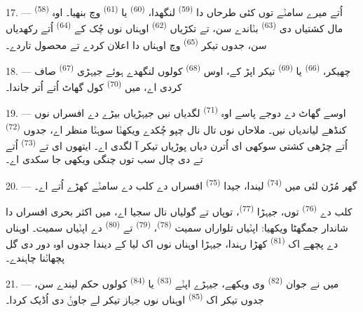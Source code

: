 17. ---  \textsuperscript{(58)} اُتے میرے سامݨے توں کئی طرحاں دا
 \textsuperscript{(59)} لنگھدا،  \textsuperscript{(60)}
یا  \textsuperscript{(61)} وچ بنھیا۔ اوہ مال کشتیاں دی
 \textsuperscript{(63)} بݨاندے سن، تے تکڑیاں 
\textsuperscript{(62)} اوہناں نوں چُک کے  \textsuperscript{(64)} اُتے
رکھدیاں سن، جدوں تیکر   \textsuperscript{(65)} وچ
اوہناں دا اعلان کردے تے محصول تاردے۔

18. --- چھیکر،  \textsuperscript{(66)} یا
 \textsuperscript{(69)} تیکر اپڑ کے، اوس 
\textsuperscript{(68)} کولوں لنگھدے ہوئے جیہڑی  \textsuperscript{(67)}
صاف کردی اے، میں  \textsuperscript{(70)} کول گھاٹ اُتے اُتر
جاندا۔

19. --- اوسے گھاٹ دے دوجے پاسے اوہ  \textsuperscript{(71)}
لگدیاں نیں جیہڑیاں بیڑے دے افسراں نوں کنڈھے لیاندیاں نیں۔ ملاحاں نوں تال نال چپو
چُکدے ویکھݨا سوہݨا منظر اے، جدوں  \textsuperscript{(72)} اُتے چڑھی کشتی
سوکھی ای اُترن دیاں پوڑیاں تیکر آ لگدی اے۔ ایتھوں ای  تے
 \textsuperscript{(73)} اُتے  تے  دی چال سب
توں چنگی ویکھی جا سکدی اے۔

\VUsaut{3.0mm}
\VUsaut{3.0mm}

20. --- گھر مُڑن لئی میں  \textsuperscript{(74)} لیندا، جیدا
 \textsuperscript{(75)} افسراں دے کلب دے سامݨے کھڑے 
اُتے اے۔

کلب دے  \textsuperscript{(76)} توں، جیہڑا 
\textsuperscript{(77)}، توپاں تے گولیاں نال سجیا اے، میں اکثر بحری افسراں دا شاندار
جمگھٹا ویکھیا: اپݨیاں تلواراں سمیت  \textsuperscript{(78)}،
 \textsuperscript{(79)} تے  \textsuperscript{(80)}
دے  اپݨیاں  سمیت۔ اوہناں دے پچھے اک 
\textsuperscript{(81)} کھڑا رہندا، جیہڑا اوہناں نوں اک  لیا کے دیندا
جدوں اوہ دور دی گل پچھاݨنا چاہندے۔

21. --- میں نے جوان  \textsuperscript{(82)} وی ویکھے، جیہڑے
اپݨے  \textsuperscript{(83)} یا  \textsuperscript{(84)}
کولوں حکم لیندے سن، جدوں تیکر اک  \textsuperscript{(85)} اوہناں
نوں جہاز تیکر لے جاوݨ دی اُڈیک کردا۔

